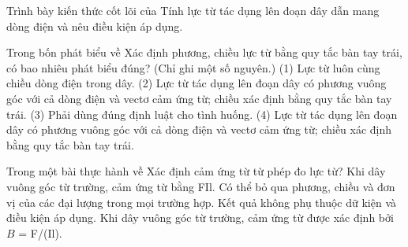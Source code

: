 \begin{bt}
Trình bày kiến thức cốt lõi của Tính lực từ tác dụng lên đoạn dây dẫn mang dòng điện và nêu điều kiện áp dụng.
\end{bt}

\begin{ex}
Trong bốn phát biểu về Xác định phương, chiều lực từ bằng quy tắc bàn tay trái, có bao nhiêu phát biểu đúng? (Chỉ ghi một số nguyên.) (1) Lực từ luôn cùng chiều dòng điện trong dây. (2) Lực từ tác dụng lên đoạn dây có phương vuông góc với cả dòng điện và vectơ cảm ứng từ; chiều xác định bằng quy tắc bàn tay trái. (3) Phải dùng đúng định luật cho tình huống. (4) Lực từ tác dụng lên đoạn dây có phương vuông góc với cả dòng điện và vectơ cảm ứng từ; chiều xác định bằng quy tắc bàn tay trái.
\end{ex}

\begin{ex}
Trong một bài thực hành về Xác định cảm ứng từ từ phép đo lực từ?
\choice
{Khi dây vuông góc từ trường, cảm ứng từ bằng FIl.}
{Có thể bỏ qua phương, chiều và đơn vị của các đại lượng trong mọi trường hợp.}
{Kết quả không phụ thuộc dữ kiện và điều kiện áp dụng.}
{\True Khi dây vuông góc từ trường, cảm ứng từ được xác định bởi $B$ = F/(Il).}
\end{ex}

